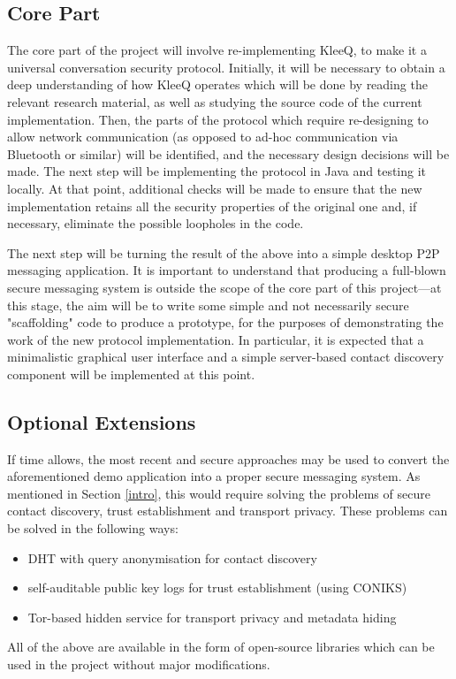 \documentclass[a4paper, twoside, 12pt]{report}
\begin{document}
\begin{appendices}
\subsection{Core Part}
The core part of the project will involve re-implementing KleeQ, to make it a universal conversation security protocol. Initially, it will be necessary to obtain a deep understanding of how KleeQ operates which will be done by reading the relevant research material, as well as studying the source code of the current implementation. Then, the parts of the protocol which require re-designing to allow network communication (as opposed to ad-hoc communication via Bluetooth or similar) will be identified, and the necessary design decisions will be made. The next step will be implementing the protocol in Java and testing it locally. At that point, additional checks will be made to ensure that the new implementation retains all the security properties of the original one and, if necessary, eliminate the possible loopholes in the code.

\vspace{\baselineskip}
\noindent
The next step will be turning the result of the above into a simple desktop P2P messaging application. It is important to understand that producing a full-blown secure messaging system is outside the scope of the core part of this project---at this stage, the aim will be to write some simple and not necessarily secure "scaffolding" code to produce a prototype, for the purposes of demonstrating the work of the new protocol implementation. In particular, it is expected that a minimalistic graphical user interface and a simple server-based contact discovery component will be implemented at this point.


\subsection{Optional Extensions}
If time allows, the most recent and secure approaches may be used to convert the aforementioned demo application into a proper secure messaging system. As mentioned in Section \ref{intro}, this would require solving the problems of secure contact discovery, trust establishment and transport privacy. These problems can be solved in the following ways:
\begin{itemize}
    \item DHT with query anonymisation for contact discovery
    \item self-auditable public key logs for trust establishment (using CONIKS)
    \item Tor-based hidden service for transport privacy and metadata hiding
\end{itemize}
All of the above are available in the form of open-source libraries which can be used in the project without major modifications.


\end{appendices}
\end{document}
